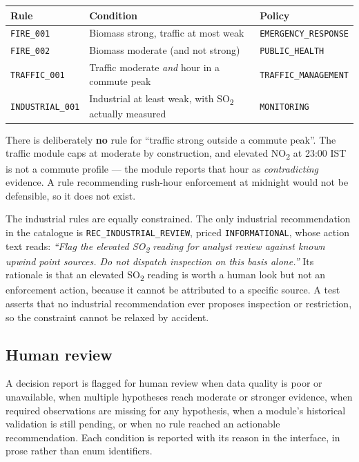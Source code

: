 \documentclass[11pt,a4paper]{article}
\newcommand{\code}[1]{\texttt{\small #1}}
\newcommand{\NOx}{NO\textsubscript{2}}
\newcommand{\SOx}{SO\textsubscript{2}}
\begin{document}
\begin{center}
\small
\begin{tabularx}{\linewidth}{@{}l X l@{}}
\toprule
\textbf{Rule} & \textbf{Condition} & \textbf{Policy} \\
\midrule
\code{FIRE\_001} & Biomass strong, traffic at most weak & \code{EMERGENCY\_RESPONSE} \\
\code{FIRE\_002} & Biomass moderate (and not strong) & \code{PUBLIC\_HEALTH} \\
\code{TRAFFIC\_001} & Traffic moderate \emph{and} hour in a commute peak & \code{TRAFFIC\_MANAGEMENT} \\
\code{INDUSTRIAL\_001} & Industrial at least weak, with \SOx{} actually measured & \code{MONITORING} \\
\bottomrule
\end{tabularx}
\end{center}

There is deliberately \textbf{no} rule for ``traffic strong outside a commute
peak''. The traffic module caps at moderate by construction, and elevated \NOx{} at
23:00 IST is not a commute profile --- the module reports that hour as
\emph{contradicting} evidence. A rule recommending rush-hour enforcement at midnight
would not be defensible, so it does not exist.

The industrial rules are equally constrained. The only industrial recommendation
in the catalogue is \code{REC\_INDUSTRIAL\_REVIEW}, priced
\code{INFORMATIONAL}, whose action text reads: \emph{``Flag the elevated \SOx{}
reading for analyst review against known upwind point sources. Do not dispatch
inspection on this basis alone.''} Its rationale is that an elevated \SOx{} reading
is worth a human look but not an enforcement action, because it cannot be attributed
to a specific source. A test asserts that no industrial recommendation ever proposes
inspection or restriction, so the constraint cannot be relaxed by accident.

\subsection{Human review}

A decision report is flagged for human review when data quality is poor or
unavailable, when multiple hypotheses reach moderate or stronger evidence, when
required observations are missing for any hypothesis, when a module's historical
validation is still pending, or when no rule reached an actionable recommendation.
Each condition is reported with its reason in the interface, in prose rather than
enum identifiers.
\end{document}
